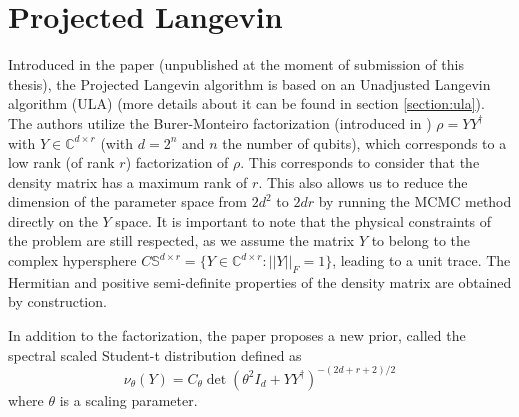 \documentclass[12pt]{memoir}
\begin{document}
\newpage
\section{Projected Langevin}\label{section:projected-langevin}

Introduced in the \cite{meth:bayesian:Langevin:ACMT2024} paper (unpublished at the moment of submission of this thesis), the Projected Langevin algorithm is based on an Unadjusted Langevin algorithm (ULA) (more details about it can be found in section \ref{section:ula}). The authors utilize the Burer-Monteiro factorization (introduced in \cite{proj-langevin:Burer2003}) $\rho = Y Y^\dagger$ with $Y \in \mathbb{C}^{d \times r}$ (with $d=2^n$ and $n$ the number of qubits), which corresponds to a low rank (of rank $r$) factorization of $\rho$. This corresponds to consider that the density matrix has a maximum rank of $r$. This also allows us to reduce the dimension of the parameter space from $2d^2$ to $2dr$ by running the MCMC method directly on the $Y$ space. It is important to note that the physical constraints of the problem are still respected, as we assume the matrix $Y$ to belong to the complex hypersphere $C \mathbb{S}^{d\times r} = \{ Y \in \mathbb{C}^{d\times r}: ||Y||_F = 1\}$, leading to a unit trace. The Hermitian and positive semi-definite properties of the density matrix are obtained by construction.\medbreak

In addition to the factorization, the paper proposes a new prior, called the spectral scaled Student-t distribution defined as
\begin{equation}    
\nu_{\theta} (Y) = C_\theta \det(\theta^2I_d + YY^\dagger)^{-(2d+r+2)/2}
\end{equation}
where $\theta$ is a scaling parameter.\medbreak
\end{document}
